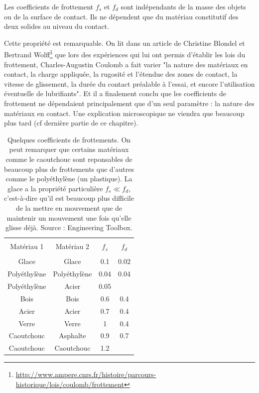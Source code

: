 \documentclass[11pt,fleqn]{book} %
\begin{document}
\begin{proposition}
    Les coefficients de frottement $f_s$ et $f_d$ sont indépendants de la masse des objets ou de la surface de contact. Ils ne dépendent que du matériau constitutif des deux solides au niveau du contact.
\end{proposition}

\begin{remark}
    Cette propriété est remarquable. On lit dans un article de Christine Blondel et Bertrand Wolff\footnote{\url{http://www.ampere.cnrs.fr/histoire/parcours-historique/lois/coulomb/frottement}} que lors des expériences qui lui ont permis d'établir les lois du frottement, Charles-Augustin Coulomb a fait varier "la nature des matériaux en contact, la charge appliquée, la rugosité et l'étendue des zones de contact, la vitesse de glissement, la durée du contact préalable à l'essai, et encore l'utilisation éventuelle de lubrifiants". Et il a finalement conclu que les coefficients de frottement ne dépendaient principalement que d'un seul paramètre : la nature des matériaux en contact. Une explication microscopique ne viendra que beaucoup plus tard (cf dernière partie de ce chapitre).
\end{remark}

\begin{table}[htbp]
    \centering
    \begin{tabular}{cccc}
    \toprule \\
      Matériau 1 & Matériau 2  & $f_s$ & $f_d$  \\
      \midrule \\
    Glace & Glace & 0.1 & 0.02 \\
    Polyéthylène & Polyéthylène & 0.04 & 0.04 \\
    Polyéthylène & Acier & 0.05 & \\
    Bois & Bois & 0.6 & 0.4 \\
    Acier & Acier & 0.7 & 0.4 \\
    Verre & Verre & 1 & 0.4 \\
    Caoutchouc & Asphalte & 0.9 & 0.7 \\
    Caoutchouc & Caoutchouc & 1.2 & \\
    \bottomrule
    \end{tabular}
    \caption{Quelques coefficients de frottements. On peut remarquer que certains matériaux comme le caoutchouc sont reponsables de beaucoup plus de frottements que d'autres comme le polyéthylène (un plastique). La glace a la propriété particulière $f_s \ll f_d$, c'est-à-dire qu'il est beaucoup plus difficile de la mettre en mouvement que de maintenir un mouvement une fois qu'elle glisse déjà. Source : Engineering Toolbox.}
    \label{tab:coefs_frottement}
\end{table}
\end{document}
